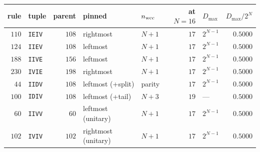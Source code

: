 \begin{tabular}{rlrllrlr}
\hline
rule & tuple & parent & pinned & $n_{\rm wcc}$ & at $N{=}16$ & $D_{\max}$ & $D_{\max}/2^N$ \\
\hline
$110$ & \texttt{IEIV} & $108$ & rightmost & $N{+}1$ & $17$ & $2^{N-1}$ & $0.5000$ \\
$124$ & \texttt{IIEV} & $108$ & leftmost & $N{+}1$ & $17$ & $2^{N-1}$ & $0.5000$ \\
$188$ & \texttt{IIVE} & $156$ & leftmost & $N{+}1$ & $17$ & $2^{N-1}$ & $0.5000$ \\
$230$ & \texttt{IVIE} & $198$ & rightmost & $N{+}1$ & $17$ & $2^{N-1}$ & $0.5000$ \\
$44$ & \texttt{IIDV} & $108$ & leftmost (+split) & parity & $17$ & $2^{N-1}$ & $0.5000$ \\
$100$ & \texttt{IDIV} & $108$ & leftmost (+tail) & $N{+}3$ & $19$ & --- & $0.5000$ \\
$60$ & \texttt{IIVV} & $60$ & leftmost (unitary) & $N{+}1$ & $17$ & $2^{N-1}$ & $0.5000$ \\
$102$ & \texttt{IVIV} & $102$ & rightmost (unitary) & $N{+}1$ & $17$ & $2^{N-1}$ & $0.5000$ \\
\hline
\end{tabular}
